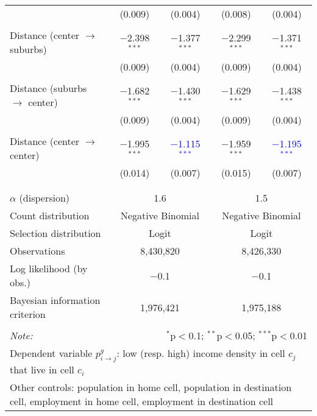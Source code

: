\begin{table}[!htbp]
{\begin{tabular}{@{\extracolsep{5pt}}lcccc}
 & (0.009) & (0.004) & (0.008) & (0.004)\\
 &  &  &  & \\
Distance (center $\to$ suburbs) & $-$2.398$^{***}$ & $-$1.377$^{***}$ & $-$2.299$^{***}$ & $-$1.371$^{***}$\\
 & (0.009) & (0.004) & (0.009) & (0.004)\\
 &  &  &  & \\
Distance (suburbs $\to$ center) & $-$1.682$^{***}$ & $-$1.430$^{***}$ & $-$1.629$^{***}$ & $-$1.438$^{***}$\\
 & (0.009) & (0.004) & (0.009) & (0.004)\\
 &  &  &  & \\
Distance (center $\to$ center) & $-$1.995$^{***}$ & \textcolor{blue}{$-$1.115$^{***}$} & $-$1.959$^{***}$ & \textcolor{blue}{$-$1.195$^{***}$}\\
 & (0.014) & (0.007) & (0.015) & (0.007)\\
 &  &  &  & \\
\hline \hline \\[-1.8ex]
$\alpha$ (dispersion) & \multicolumn{2}{c}{1.6} & \multicolumn{2}{c}{1.5} \\
Count distribution & \multicolumn{2}{c}{Negative Binomial} & \multicolumn{2}{c}{Negative Binomial} \\
Selection distribution & \multicolumn{2}{c}{Logit} & \multicolumn{2}{c}{Logit} \\
Observations & \multicolumn{2}{c}{8,430,820} & \multicolumn{2}{c}{8,426,330} \\
Log likelihood (by obs.) & \multicolumn{2}{c}{$-$0.1} & \multicolumn{2}{c}{$-$0.1} \\
Bayesian information criterion & \multicolumn{2}{c}{1,976,421} & \multicolumn{2}{c}{1,975,188} \\
\hline
\hline \\[-1.8ex]
\textit{Note:}  & \multicolumn{4}{r}{$^{*}$p$<$0.1; $^{**}$p$<$0.05; $^{***}$p$<$0.01} \\
 \multicolumn{5}{p{0.9\linewidth}}{\parbox[t]{\textwidth}{Dependent variable $p_{i \to j}^g$: low (resp. high) income density in cell $c_j$ that live in cell $c_i$}} \\
\multicolumn{5}{p{0.9\linewidth}}{\parbox[t]{\textwidth}{Other controls: population in home cell, population in destination cell, employment in home cell, employment in destination cell}}
\end{tabular}
}
\end{table}
